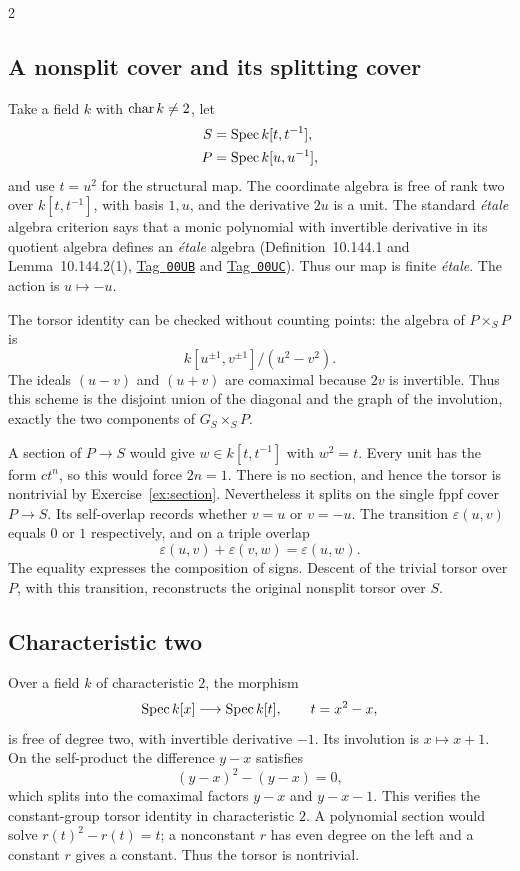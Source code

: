 \documentclass[12pt]{memoir}
\newcommand{\BGtag}[1]{\href{https://stacks.math.columbia.edu/tag/#1}{Tag~\texttt{#1}}}
\begin{document}
\begin{multicols}{2}
\subsection{A nonsplit cover and its splitting cover}
Take a field $k$ with $\operatorname{char} k\ne2$, let
\[
\begin{aligned}
 S&=\operatorname{Spec} k[t,t^{-1}],\\
 P&=\operatorname{Spec} k[u,u^{-1}],
\end{aligned}
\]
and use $t=u^2$ for the structural map. The coordinate algebra is free
of rank two over $k[t,t^{-1}]$, with basis $1,u$, and the derivative
$2u$ is a unit. The standard \emph{\'etale} algebra criterion says that
a monic polynomial with invertible derivative in its quotient algebra
defines an \emph{\'etale} algebra (Definition~10.144.1 and
Lemma~10.144.2(1), \BGtag{00UB} and \BGtag{00UC}). Thus our map is
finite \emph{\'etale}. The action is
$u\mapsto-u$.

The torsor identity can be checked without counting points: the algebra
of $P\times_S P$ is
\[
 k[u^{\pm1},v^{\pm1}]/(u^2-v^2).
\]
The ideals $(u-v)$ and $(u+v)$ are comaximal because $2v$ is invertible.
Thus this scheme is the disjoint union of the diagonal and the graph of
the involution, exactly the two components of $G_S\times_S P$.

A section of $P\to S$ would give $w\in k[t,t^{-1}]$ with $w^2=t$.
Every unit has the form $ct^n$, so this would force $2n=1$.
There is no section, and hence the torsor is nontrivial by
Exercise~\ref{ex:section}. Nevertheless it splits on the single fppf
cover $P\to S$. Its self-overlap records whether $v=u$ or $v=-u$.
The transition $\varepsilon(u,v)$ equals $0$ or $1$ respectively, and
on a triple overlap
\[
 \varepsilon(u,v)+\varepsilon(v,w)=\varepsilon(u,w).
\]
The equality expresses the composition of signs. Descent of the trivial
torsor over $P$, with this transition, reconstructs the original
nonsplit torsor over $S$.

\subsection{Characteristic two}
Over a field $k$ of characteristic $2$, the morphism
\[
 \operatorname{Spec} k[x]\longrightarrow\operatorname{Spec} k[t],
 \qquad t=x^2-x,
\]
is free of degree two, with invertible derivative $-1$.
Its involution is $x\mapsto x+1$. On the self-product the difference
$y-x$ satisfies
\[
 (y-x)^2-(y-x)=0,
\]
which splits into the comaximal factors $y-x$ and $y-x-1$.
This verifies the constant-group torsor identity in characteristic $2$.
A polynomial section would solve $r(t)^2-r(t)=t$; a nonconstant $r$
has even degree on the left and a constant $r$ gives a constant. Thus
the torsor is nontrivial.


\end{multicols}
\end{document}
